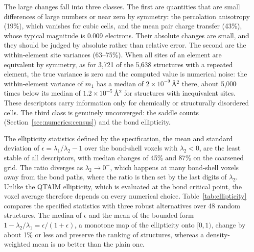 \documentclass[11pt,a4paper]{article}
\begin{document}
The large changes fall into three classes. The first are quantities that are
small differences of large numbers or near zero by symmetry: the percolation
anisotropy (19\%), which vanishes for cubic cells, and the mean pair charge
transfer (43\%), whose typical magnitude is 0.009 electrons. Their absolute
changes are small, and they should be judged by absolute rather than relative
error. The second are the within-element site variances (63--75\%). When all
sites of an element are equivalent by symmetry, as for 3,721 of the 5,638
structures with a repeated element, the true variance is zero and the computed
value is numerical noise: the within-element variance of $m_1$ has a median of
$2\times10^{-9}$\,\AA$^2$ there, about 5,000 times below its median of
$1.2\times10^{-5}$\,\AA$^2$ for structures with inequivalent sites. These
descriptors carry information only for chemically or structurally disordered
cells. The third class is genuinely unconverged: the saddle counts
(Section~\ref{sec:numerics:census}) and the bond ellipticity.

The ellipticity statistics defined by the specification, the mean and
standard deviation of $\epsilon=\lambda_1/\lambda_2-1$ over the bond-shell
voxels with $\lambda_2<0$, are the least stable of all descriptors, with median
changes of 45\% and 87\% on the coarsened grid. The ratio diverges as
$\lambda_2\to0^-$, which happens at many bond-shell voxels away from the bond
paths, where the ratio is then set by the last digits of $\lambda_2$. Unlike
the QTAIM ellipticity, which is evaluated at the bond critical point, the
voxel average therefore depends on every numerical choice.
Table~\ref{tab:ellipticity} compares the specified statistics with three robust
alternatives over 48 random structures. The median of $\epsilon$ and the mean
of the bounded form $1-\lambda_2/\lambda_1=\epsilon/(1+\epsilon)$, a monotone
map of the ellipticity onto $[0,1)$, change by about 1\% or less and preserve
the ranking of structures, whereas a density-weighted mean is no better than
the plain one.
\end{document}
